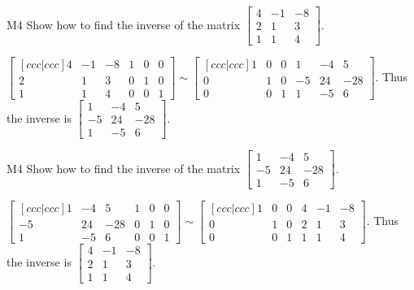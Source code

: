 \begin{problem}{M4}
  Show how to find the inverse of the matrix
  \(\begin{bmatrix}
    4 & -1 & -8  \\
    2 & 1 & 3  \\
    1 & 1 & 4
  \end{bmatrix}\).
\end{problem}
\begin{solution}
\(\begin{bmatrix}[ccc|ccc]
  4 & -1 & -8 & 1 & 0 & 0  \\
  2 & 1 & 3   & 0 & 1 & 0 \\
  1 & 1 & 4   & 0 & 0 & 1
\end{bmatrix}\sim\begin{bmatrix}[ccc|ccc]
  1 & 0 & 0 & 1 & -4 & 5 \\
  0 & 1 & 0 & -5 & 24 & -28 \\
  0 & 0 & 1 & 1 & -5 & 6
\end{bmatrix}\). Thus the inverse is
\(\begin{bmatrix}
  1 & -4 & 5  \\
  -5 & 24 & -28  \\
  1 & -5 & 6
\end{bmatrix}\).
\end{solution}


\begin{problem}{M4}
  Show how to find the inverse of the matrix
  \(\begin{bmatrix}
    1 & -4 & 5  \\
    -5 & 24 & -28  \\
    1 & -5 & 6
  \end{bmatrix}\).
\end{problem}
\begin{solution}
\(\begin{bmatrix}[ccc|ccc]
  1 & -4 & 5 & 1 & 0 & 0  \\
  -5 & 24 & -28 & 0 & 1 & 0 \\
  1 & -5 & 6 & 0 & 0 & 1
\end{bmatrix}\sim\begin{bmatrix}[ccc|ccc]
  1 & 0 & 0 & 4 & -1 & -8  \\
  0 & 1 & 0 & 2 & 1 & 3  \\
  0 & 0 & 1 & 1 & 1 & 4
\end{bmatrix}\). Thus the inverse is
\(\begin{bmatrix}
  4 & -1 & -8  \\
  2 & 1 & 3  \\
  1 & 1 & 4
\end{bmatrix}\).
\end{solution}


